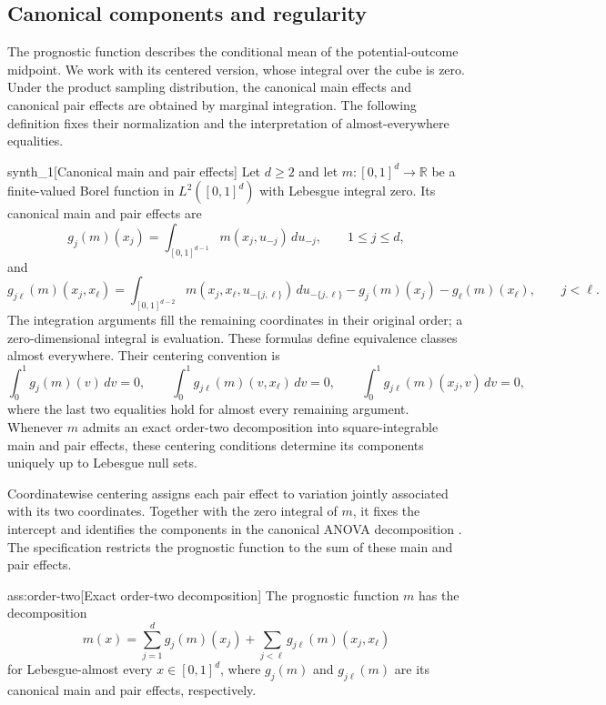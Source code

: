 \subsection{Canonical components and regularity}

The prognostic function  describes the conditional mean of the potential-outcome midpoint. We work with its centered version, whose integral over the cube is zero. Under the product sampling distribution, the canonical main effects  and canonical pair effects  are obtained by marginal integration. The following definition fixes their normalization and the interpretation of almost-everywhere equalities.

\begin{definitionv}{synth_1}[Canonical main and pair effects]
Let \(d\geq2\) and let \(m:[0,1]^d\to\mathbb R\) be a finite-valued Borel function in \(L^2([0,1]^d)\) with Lebesgue integral zero. Its canonical main and pair effects are
\[
g_j(m)(x_j)
=\int_{[0,1]^{d-1}}m(x_j,u_{-j})\,du_{-j},
\qquad 1\leq j\leq d,
\]
and
\[
g_{j\ell}(m)(x_j,x_\ell)
=\int_{[0,1]^{d-2}}
m(x_j,x_\ell,u_{-\{j,\ell\}})\,du_{-\{j,\ell\}}
-g_j(m)(x_j)-g_\ell(m)(x_\ell),
\qquad j<\ell.
\]
The integration arguments fill the remaining coordinates in their original order; a zero-dimensional integral is evaluation. These formulas define equivalence classes almost everywhere. Their centering convention is
\[
\int_0^1g_j(m)(v)\,dv=0,
\qquad
\int_0^1g_{j\ell}(m)(v,x_\ell)\,dv=0,
\qquad
\int_0^1g_{j\ell}(m)(x_j,v)\,dv=0,
\]
where the last two equalities hold for almost every remaining argument. Whenever \(m\) admits an exact order-two decomposition into square-integrable main and pair effects, these centering conditions determine its components uniquely up to Lebesgue null sets.
\end{definitionv}

Coordinatewise centering assigns each pair effect to variation jointly associated with its two coordinates. Together with the zero integral of \(m\), it fixes the intercept and identifies the components in the canonical ANOVA decomposition \citep{Hoeffding1948,Sobol1993}. The specification restricts the prognostic function to the sum of these main and pair effects.

\begin{assumptionv}{ass:order-two}[Exact order-two decomposition]
The prognostic function \(m\) has the decomposition
\[
m(x)=\sum_{j=1}^d g_j(m)(x_j)
+\sum_{j<\ell}g_{j\ell}(m)(x_j,x_\ell)
\]
for Lebesgue-almost every \(x\in[0,1]^d\), where \(g_j(m)\) and \(g_{j\ell}(m)\) are its canonical main and pair effects, respectively.
\end{assumptionv}

